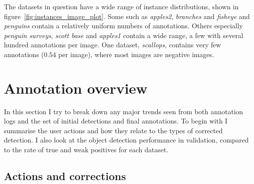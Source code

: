 The datasets in question have a wide range of instance distributions, shown in figure~\ref{fig:instances_image_plot}. Some such as \emph{apples2}, \emph{branches} and \emph{fisheye} and \emph{penguins} contain a relatively uniform numbers of annotations. Others especially \emph {penguin surveys}, \emph{scott base} and \emph{apples1} contain a wide range, a few with several hundred annotations per image. One dataset, \emph{scallops}, contains very few annotations ($0.54$ per image), where most images are negative images.


\section {Annotation overview}
\label{sec:annotation_overview}

In this section I try to break down any major trends seen from both annotation logs and the set of initial detections and final annotations. To begin with I summarise the user actions and how they relate to the types of corrected detection. I also look at the object detection performance in validation, compared to the rate of true and weak positives for each dataset.

\subsection {Actions and corrections}

